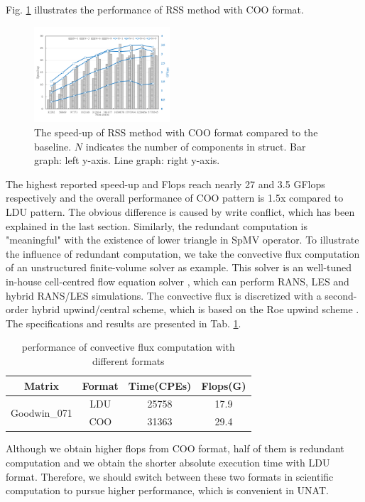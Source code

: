 \documentclass[5p,times]{elsarticle}
\begin{document}
Fig. \ref{rsscsr} illustrates the performance of RSS method with COO format.
\begin{figure}[tbp]
\centerline{\includegraphics[width=0.45\textwidth]{rss(csr)-1.png}}
\caption{The speed-up of RSS method with COO format compared to the baseline. $N$ indicates the number of components in struct. Bar graph: left y-axis. Line graph: right y-axis.}
\label{rsscsr}
\end{figure}
The highest reported speed-up and Flops reach nearly 27 and 3.5 GFlops respectively and the overall performance of COO pattern is 1.5x compared to LDU pattern. The obvious difference is caused by write conflict, which has been explained in the last section. Similarly, the redundant computation is "meaningful" with the existence of lower triangle in SpMV operator. To illustrate the influence of redundant computation, we take the convective flux computation of an unstructured finite-volume solver as example. This solver is an well-tuned in-house cell-centred flow equation solver \cite{b13}\cite{b14}, which can perform RANS, LES and hybrid RANS/LES simulations. The convective flux is discretized with a second-order hybrid upwind/central scheme, which is based on the Roe upwind scheme \cite{b15}. The specifications and results are presented in Tab. \ref{umbt_conv}.
\begin{table}[]
\centering
\caption{performance of convective flux computation with different formats}
\begin{tabular}{|c|c|c|c|}
\hline
Matrix                        & Format & Time(CPEs) & Flops(G) \\ \hline
\multirow{2}{*}{Goodwin\_071} & LDU    & 25758         & 17.9     \\ \cline{2-4} 
                              & COO    & 31363          & 29.4     \\ \hline
\end{tabular}
\label{umbt_conv}
\end{table}
Although we obtain higher flops from COO format, half of them is redundant computation and we obtain the shorter absolute execution time with LDU format. Therefore, we should switch between these two formats in scientific computation to pursue higher performance, which is convenient in UNAT.
\end{document}

